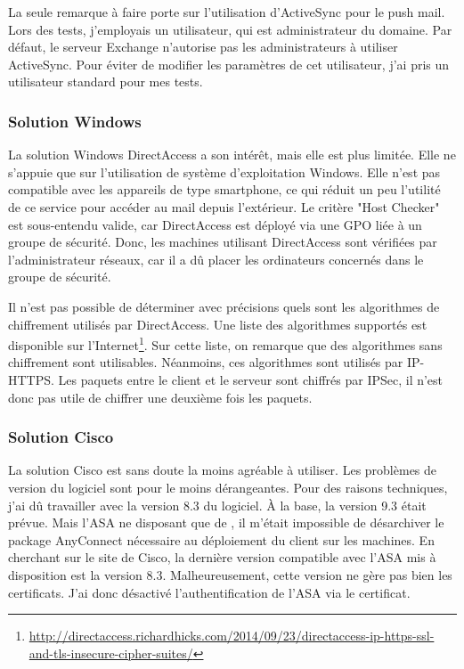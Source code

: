 La seule remarque à faire porte sur l'utilisation d'ActiveSync pour le push mail.
Lors des tests, j'employais un utilisateur, qui est administrateur du domaine.
Par défaut, le serveur Exchange n'autorise pas les administrateurs à utiliser ActiveSync.
Pour éviter de modifier les paramètres de cet utilisateur, j'ai pris un utilisateur standard pour mes tests.

\subsubsection{Solution Windows}
La solution Windows DirectAccess a son intérêt, mais elle est plus limitée.
Elle ne s'appuie que sur l'utilisation de système d'exploitation Windows.
Elle n'est pas compatible avec les appareils de type smartphone, ce qui réduit un peu l'utilité de ce service pour accéder au mail depuis l'extérieur.
Le critère "Host Checker" est sous-entendu valide, car DirectAccess est déployé via une GPO liée à un groupe de sécurité.
Donc, les machines utilisant DirectAccess sont vérifiées par l'administrateur réseaux, car il a dû placer les ordinateurs concernés dans le groupe de sécurité.

Il n'est pas possible de déterminer avec précisions quels sont les algorithmes de chiffrement utilisés par DirectAccess.
Une liste des algorithmes supportés est disponible sur l'Internet\footnote{\url{http://directaccess.richardhicks.com/2014/09/23/directaccess-ip-https-ssl-and-tls-insecure-cipher-suites/}}.
Sur cette liste, on remarque que des algorithmes sans chiffrement sont utilisables.
Néanmoins, ces algorithmes sont utilisés par IP-HTTPS.
Les paquets entre le client et le serveur sont chiffrés par IPSec, il n'est donc pas utile de chiffrer une deuxième fois les paquets.

\subsubsection{Solution Cisco}
La solution Cisco est sans doute la moins agréable à utiliser.
Les problèmes de version du logiciel sont pour le moins dérangeantes.
Pour des raisons techniques, j'ai dû travailler avec la version 8.3 du logiciel.
À la base, la version 9.3 était prévue.
Mais l'ASA ne disposant que de , il m'était impossible de désarchiver le package AnyConnect nécessaire au déploiement du client sur les machines.
En cherchant sur le site de Cisco, la dernière version compatible avec l'ASA mis à disposition est la version 8.3.
Malheureusement, cette version ne gère pas bien les certificats.
J'ai donc désactivé l'authentification de l'ASA via le certificat.

